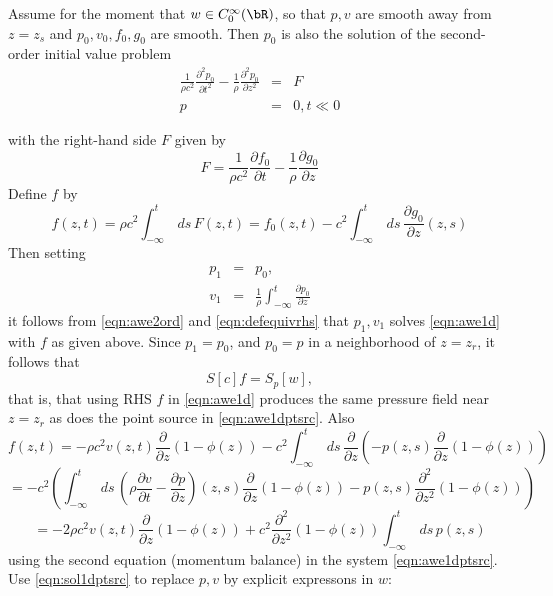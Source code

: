 Assume for the moment that $w \in C^{\infty}_0(\bR)$, so that $p,v$
are smooth away from $z=z_s$ and $p_0, v_0, f_0, g_0$ are smooth. Then
$p_0$ is also the solution of the second-order initial value problem
\begin{eqnarray}
  \label{eqn:awe2ord}
  \frac{1}{\rho c^2} \frac{\partial^2 p_0}{\partial t^2} -
  \frac{1}{\rho}\frac{\partial^2 p_0}{\partial z^2} &=& F\nonumber \\
  p &=& 0, t\ll 0
\end{eqnarray}
   
with the right-hand side $F$ given by
\begin{equation}
  \label{eqn:rhs2ord}
  F = \frac{1}{\rho c^2}\frac{\partial f_0}{\partial t} -
  \frac{1}{\rho}\frac{\partial g_0}{\partial z}
\end{equation}
Define $f$ by
\begin{equation}
  \label{eqn:defequivrhs}
  f(z,t) = \rho c^2 \int_{-\infty}^t \,ds\,F(z,t) =  f_0(z,t) - c^2\int_{-\infty}^{t}\,ds\,\frac{\partial
    g_0}{\partial z}(z,s)
\end{equation}
Then setting
\begin{eqnarray*}
  p_1 &=& p_0,\\
  v_1 &=& \frac{1}{\rho}\int_{-\infty}^t\frac{\partial p_0}{\partial z}
\end{eqnarray*}
it follows from \ref{eqn:awe2ord} and \ref{eqn:defequivrhs} that
$p_1,v_1$ solves \ref{eqn:awe1d} with $f$ as given above. Since
$p_1=p_0$, and $p_0=p$ in a neighborhood of $z=z_r$, it follows that
\begin{equation}
  \label{eqn:impext}
  S[c]f = S_p[w],
\end{equation}
that is, that using RHS $f$ in \ref{eqn:awe1d} produces the same
pressure field near $z=z_r$ as does the point source in
\ref{eqn:awe1dptsrc}. Also
\[
  f(z,t) = -\rho c^2 v(z,t) \frac{\partial}{\partial z}(1-\phi(z)) - c^2
  \int_{-\infty}^t\,ds\, \frac{\partial}{\partial z}\left(-p(z,s) \frac{\partial}{\partial z}(1-\phi(z))\right)
\]
\[
  = - c^2 \left(\int_{-\infty}^t\,ds\,\left( \rho \frac{\partial v}{\partial
      t} -\frac{\partial p}{\partial
      z}\right)(z,s)\frac{\partial}{\partial z}(1-\phi(z))
  -p(z,s)\frac{\partial^2}{\partial z^2}(1-\phi(z)) \right)
\]
\[
  = -2\rho c^2 v(z,t)\frac{\partial}{\partial z}(1-\phi(z)) +
  c^2\frac{\partial^2}{\partial z^2}(1-\phi(z))\int_{-\infty}^t
  \,ds\,p(z,s)
\]
using the second equation (momentum balance) in the system
\ref{eqn:awe1dptsrc}. Use \ref{eqn:sol1dptsrc} to replace $p,v$ by
explicit expressons in $w$:
